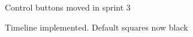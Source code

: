 \documentclass[11pt]{article} %
\begin{document}
  \begin{figure}[H]
  	\centering
  	\caption{Control buttons moved in sprint 3}
  	\label{fig:GUI Design 4}
  \end{figure}
  
  \begin{figure}[H]
  	\centering
  	\caption{Timeline implemented. Default squares now black}
  	\label{fig:GUI Design 5}
  \end{figure}  
  
\end{document}
